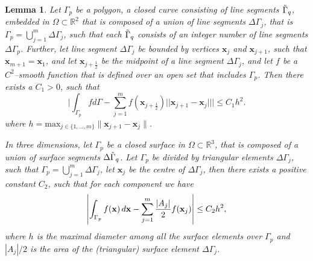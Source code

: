 \documentclass[pdflatex,sn-mathphys-num]{sn-jnl}
\newtheorem{lemma}{Lemma}
\newtheorem*{lemma star}{Lemma}
\begin{document}
\begin{lemma}\label{lemma:midpoint}
    Let $\Gamma_p$ be a polygon, a closed curve consisting of line segments $\Tilde{\Gamma}_q$, embedded in $\Omega \subset \mathbb{R}^2$ that is composed of 
a union of line segments $\Delta \Gamma_j$, that is ${\Gamma_p = \bigcup_{j=1}^m\Delta \Gamma_j}$, such that each $\Tilde{\Gamma}_q$ consists of an integer number of line segments $\Delta \Gamma_p$. Further, let line segment $\Delta \Gamma_j$ be bounded by vertices $\mathbf{x}_j$ and $\mathbf{x}_{j+1}$, such that 
$\mathbf{x}_{m+1} = \mathbf{x}_{1}$, and let $\mathbf{x}_{j+\frac12}$ be the midpoint of a line segment $\Delta \Gamma_j$, and let $f$ be a $C^2$--smooth function that is defined over an open set 
that includes $\Gamma_p$. Then there exists a $C_1>0$, such that
$$
\bigg| \int_{\Gamma_p} f d \Gamma - \sum_{j = 1}^m f(\mathbf{x}_{j+\frac12}) || \mathbf{x}_{j+1} - \mathbf{x}_j ||  \bigg|\le C_1 h^2.
$$
where $h=\text{max}_{j\in{\{1,...,m}\}}\parallel\mathbf{x}_{j+1} - \mathbf{x}_j\parallel$.

In three dimensions, let $\Gamma_p$ be a closed surface in $\Omega \subset \mathbb{R}^3$, that is composed of a union of surface segments $\Delta \Tilde{\Gamma}_q$. Let $\Gamma_p$ be divided by triangular elements $\Delta \Gamma_j$, such that ${\Gamma_p = \bigcup_{j=1}^m\Delta \Gamma_j}$, let $\mathbf{x}_j$ be the centre of $\Delta \Gamma_j$, then there exists a positive constant $C_2$, such that for each component we have
\[
\left| \int_{\Gamma_p} f({\bf x}) \, d{\bf x} - \sum_{j=1}^{m} \frac{|A_j|}{2} f({\bf x}_j) \right| \leq {C_2}h{^2},
\]
where $h$ is the maximal diameter among all the surface elements over $\Gamma_p$ and $| A_j |/2$ is the area of the (triangular) surface element $\Delta \Gamma_j$.
\end{lemma}
\end{document}
